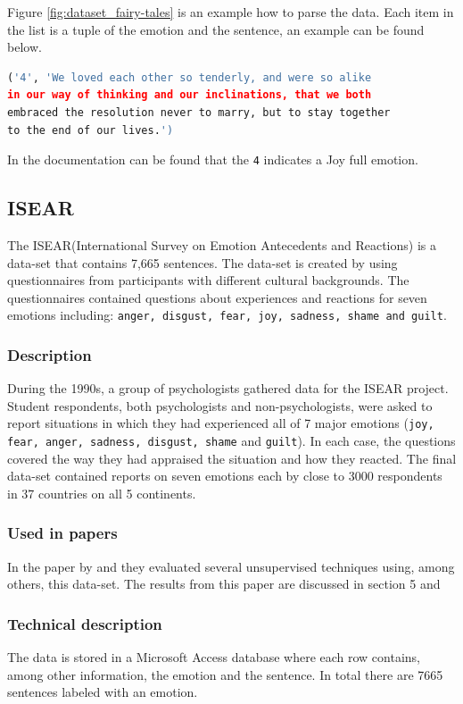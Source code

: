 \documentclass[
10pt, %
a4paper, %
oneside, %
headinclude,footinclude, %
BCOR5mm, %
]{scrartcl}
\begin{document}
Figure \ref{fig:dataset_fairy-tales} is an example how to parse the data. Each item in the list is a tuple of the emotion and the sentence, an example can be found below.
\begin{lstlisting}[language=python, caption=Fairy tales example]
('4', 'We loved each other so tenderly, and were so alike 
in our way of thinking and our inclinations, that we both 
embraced the resolution never to marry, but to stay together 
to the end of our lives.')
\end{lstlisting}
In the documentation can be found that the \texttt{4} indicates a Joy full emotion.


\subsection{ISEAR}
The ISEAR(International Survey on Emotion Antecedents and Reactions) is a data-set that contains 7,665 sentences. The data-set is created by using questionnaires from participants with different cultural backgrounds. The questionnaires contained questions about experiences and reactions for seven emotions including: \texttt{anger, disgust, fear, joy, sadness, shame and guilt}. 


\subsubsection{Description}
During the 1990s, a group of psychologists gathered data for the ISEAR project. Student respondents, both psychologists and non-psychologists, were asked to report situations in which they had experienced all of 7 major emotions (\texttt{joy, fear, anger, sadness, disgust, shame} and \texttt {guilt}). In each case, the questions covered the way they had appraised the situation and how they reacted. The final data-set contained reports on seven emotions each by close to 3000 respondents in 37 countries on all 5 continents.

\subsubsection{Used in papers}
In the paper by \citeauthor{kim2010evaluation} and \citeauthor{calvo2013emotions} they evaluated several unsupervised techniques using, among others, this data-set. The results from this paper are discussed in section 5 \citet{kim2010evaluation} and \citet{calvo2013emotions }

\subsubsection{Technical description}
The data is stored in a Microsoft Access database where each row contains, among other information, the emotion and the sentence. In total there are 7665 sentences labeled with an emotion.
\end{document}
